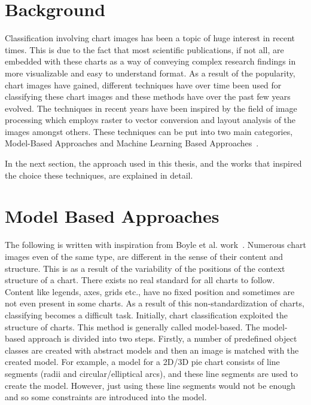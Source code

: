 \documentclass[12pt, a4paper,oneside]{report}
\begin{document}
\section{Background}
Classification involving chart images has been a topic of huge interest in recent times. This is due to the fact that most scientific publications, if not all, are embedded with these charts as a way of conveying complex research findings in more visualizable and easy to understand format. As a result of the popularity, chart images have gained, different techniques have over time been used for classifying these chart images and these methods have over the past few years evolved. The techniques in recent years have been inspired by the field of image processing which employs raster to vector conversion and layout analysis of the images amongst others. These techniques can be put into two main categories, Model-Based Approaches and Machine Learning Based Approaches~\cite{amara2017convolutional}. 

In the next section, the approach used in this thesis, and the works that inspired the choice these techniques, are explained in detail.

\section{Model Based Approaches}
The following is written with inspiration from Boyle et al. work~\cite{boyle2007advances}. Numerous chart images even of the same type, are different in the sense of their content and structure. This is as a result of the variability of the positions of the context structure of a chart. There exists no real standard for all charts to follow. Content like legends, axes, grids etc., have no fixed position and sometimes are not even present in some charts. As a result of this non-standardization of charts, classifying becomes a difficult task. Initially, chart classification exploited the structure of charts. This method is generally called model-based. The model-based approach is divided into two steps. Firstly, a number of predefined object classes are created with abstract models and then an image is matched with the created model. For example, a model for a 2D/3D pie chart consists of line segments (radii and circular/elliptical arcs), and these line segments are used to create the model. However, just using these line segments would not be enough and so some constraints are introduced into the model. 
\end{document}
